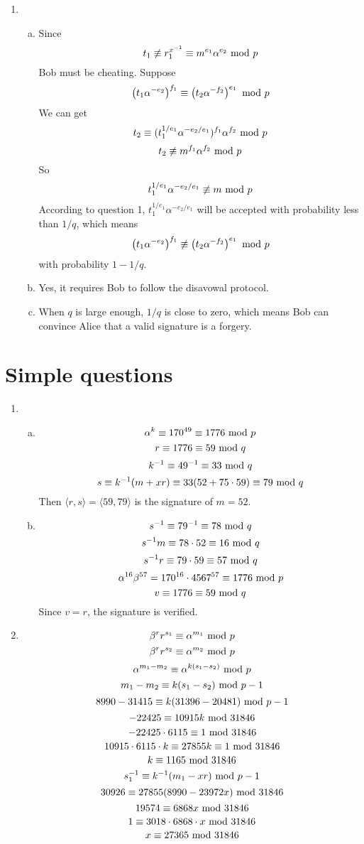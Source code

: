 \documentclass{article}
\renewcommand{\mod}{{\rm\ mod\ }}
\begin{document}
\begin{enumerate}
\item
\begin{enumerate}[(a)]
\item
Since $$t_1 \not\equiv r_1^{x^{-1}} \equiv m^{e_1}\alpha^{e_2} \mod p$$
Bob must be cheating. Suppose $$\left(t_1\alpha^{-e_2}\right)^{f_1} \equiv \left(t_2\alpha^{-f_2}\right)^{e_1} \mod p$$
We can get
$$t_2\equiv (t_1^{1/e_1}\alpha^{-e_2/e_1})^{f_1}\alpha^{f_2} \mod p$$
$$t_2\not\equiv m^{f_1}\alpha^{f_2} \mod p$$
So $$t_1^{1/e_1}\alpha^{-e_2/e_1} \not\equiv m \mod p$$
According to question 1, $t_1^{1/e_1}\alpha^{-e_2/e_1}$ will be accepted with probability less than $1/q$, which means $$\left(t_1\alpha^{-e_2}\right)^{f_1} \not\equiv \left(t_2\alpha^{-f_2}\right)^{e_1} \mod p$$
with probability $1-1/q$.

\item
Yes, it requires Bob to follow the disavowal protocol.
\item
When $q$ is large enough, $1/q$ is close to zero, which means Bob can convince Alice that a valid signature is a forgery.
\end{enumerate}

\end{enumerate}

\section{Simple questions}
\begin{enumerate}
\item
\begin{enumerate}[(a)]
\item
$$\alpha^k \equiv 170^{49} \equiv 1776 \mod p$$
$$r \equiv 1776 \equiv 59 \mod q$$
$$k^{-1} \equiv 49^{-1} \equiv 33 \mod q$$
$$s \equiv k^{-1}(m+xr) \equiv 33(52+75\cdot59)\equiv 79 \mod q$$
Then $\langle r,s\rangle=\langle 59,79\rangle$ is the signature of $m=52$.
\item
$$s^{-1} \equiv 79^{-1} \equiv 78 \mod q$$
$$s^{-1}m \equiv 78\cdot52 \equiv 16 \mod q$$
$$s^{-1}r \equiv 79\cdot59 \equiv 57 \mod q$$
$$\alpha^{16}\beta^{57}=170^{16}\cdot 4567^{57} \equiv 1776 \mod p$$
$$v \equiv 1776 \equiv 59 \mod q$$
Since $v=r$, the signature is verified.
\end{enumerate}

\item
$$\beta^r r^{s_1} \equiv \alpha^{m_1} \mod p$$
$$\beta^r r^{s_2} \equiv \alpha^{m_2} \mod p$$
$$\alpha^{m_1-m_2} \equiv \alpha^{k(s_1-s_2)} \mod p$$
$$m_1-m_2 \equiv k(s_1-s_2) \mod p-1$$
$$8990-31415 \equiv k(31396-20481) \mod p-1$$
$$-22425 \equiv 10915k \mod 31846$$
$$-22425 \cdot 6115 \equiv 1 \mod 31846$$
$$10915 \cdot 6115 \cdot k \equiv 27855k \equiv 1 \mod 31846$$
$$k \equiv 1165 \mod 31846$$
$$s_1^{-1} \equiv k^{-1}(m_1-xr) \mod p-1$$
$$30926 \equiv 27855(8990-23972x) \mod 31846$$
$$19574 \equiv 6868x \mod 31846$$
$$1 \equiv 3018\cdot6868\cdot x \mod 31846$$
$$x \equiv 27365 \mod 31846$$
\end{enumerate}
\end{document}
